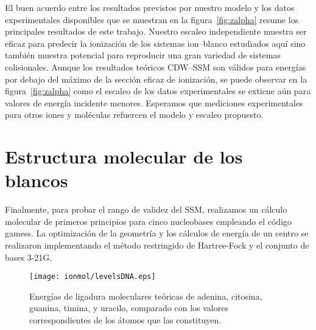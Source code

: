 El buen acuerdo entre los resultados previstos por nuestro modelo y los
datos experimentales disponibles que se muestran en la 
figura~\ref{fig:zalpha} resume los principales resultados de este 
trabajo. Nuestro escaleo independiente muestra ser eficaz para predecir 
la ionización de los sistemas ion--blanco estudiados aquí sino también 
muestra potencial para reproducir una gran variedad de sistemas 
colisionales. Aunque los resultados teóricos CDW--SSM son válidos para
energías por debajo del máximo de la sección eficaz de ionización, se
puede observar en la figura~\ref{fig:zalpha} como el escaleo de los datos 
experimentales se extiene aún para valores de energía incidente menores.
Esperamos que mediciones experimentales para otros iones y moléculas 
refuercen el modelo y escaleo propuesto.

\section{Estructura molecular de los blancos}
\label{sec:molcalculations}

Finalmente, para probar el rango de validez del SSM, realizamos un 
cálculo molecular de primeros principios para cinco nucleobases 
empleando el código {\sc gamess}. La optimización de la geometría y los 
cálculos de energía de un centro se realizaron implementando el método
restringido de Hartree-Fock y el conjunto de bases 3-21G. 

\begin{figure}
\centering
\texttt{[image: ionmol/levelsDNA.eps]}
\caption[Energías de ligadura moleculares teóricas de ADN y ARN.]
{Energías de ligadura moleculares teóricas de adenina, citosina, guanina, 
timina, y uracilo, comparado con los valores correspondientes de los 
átomos que las constituyen.}
\label{fig:bindener}
\end{figure}

